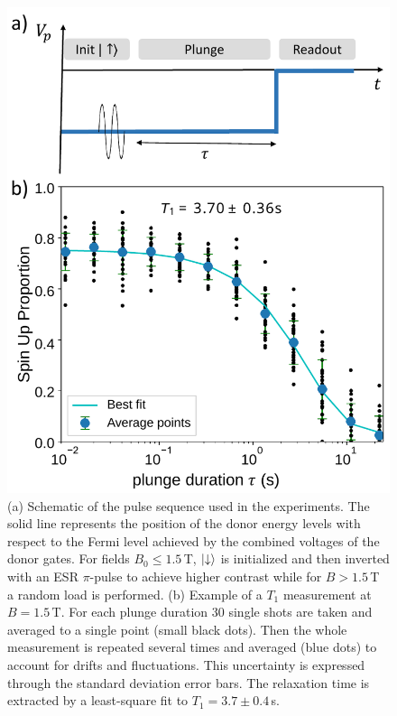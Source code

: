 \begin{figure}
\centering
\includegraphics[width=0.7\columnwidth]{figures/fig2.pdf}
\caption{
(a) Schematic of the pulse sequence used in the experiments. The solid line represents the position of the donor energy levels with respect to the Fermi level achieved by the combined voltages of the donor gates. For fields $B_0\leq1.5\,$T, $\ket{\downarrow}$ is initialized and then inverted with an ESR $\pi$-pulse to achieve higher contrast while for $B>1.5\,$T a random load is performed. (b) Example of a $T_1$ measurement at $B=1.5\,$T. For each plunge duration $30$ single shots are taken and averaged to a single point (small black dots). Then the whole measurement is repeated several times and averaged (blue dots) to account for drifts and fluctuations. This uncertainty is expressed through the standard deviation error bars. The relaxation time is extracted by a least-square fit to $T_1=3.7\pm0.4\,$s.
}
\label{fig:t1example}
\end{figure}

